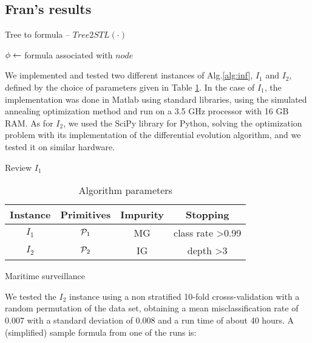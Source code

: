 \subsection{Fran's results}
\begin{algorithm}
\caption{Tree to formula -- $Tree2STL(\cdot)$}
\label{alg:tree2formula}
\DontPrintSemicolon
{}
\BlankLine


$\phi \leftarrow$ formula associated with $node$

\end{algorithm}

We implemented and tested two different instances of Alg.\ref{alg:inf}, $I_1$ and $I_2$, defined by the choice of parameters given in Table \ref{tab:inst}. In the case of $I_1$, the implementation was done in Matlab using standard libraries, using the simulated annealing optimization method and run on a 3.5 GHz processor with 16 GB RAM. As for $I_2$, we used the SciPy library for Python, solving the optimization problem with its implementation of the differential evolution algorithm, and we tested it on similar hardware.

{\color{blue} Review $I_1$}

\begin{table}
\begin{tabular}{|c|c|c|c|}
    \hline
    Instance & Primitives & Impurity & Stopping \\ \hline
    $I_1$ & $\mathcal{P}_1$ & MG & class rate >0.99 \\ \hline
    $I_2$ & $\mathcal{P}_2$ & IG & depth >3 \\ \hline
\end{tabular}
\caption{Algorithm parameters}
\label{tab:inst}
\end{table}

Maritime surveillance

We tested the $I_2$ instance using a non stratified 10-fold crosss-validation with a random permutation of the data set, obtaining a mean misclassification rate of 0.007 with a standard deviation of 0.008 and a run time of about 40 hours. A (simplified) sample formula from one of the runs is:

